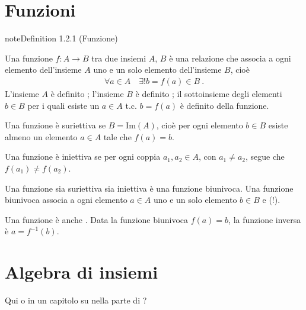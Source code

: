 \documentclass[letterpaper,10pt,italian]{jupyterBook}
\begin{document}
\section{}
\label{\detokenize{ch/set:id1}}

\section{Funzioni}
\label{\detokenize{ch/set:funzioni}}\label{\detokenize{ch/set:math-hs-fun}}\label{ch/set:set-fun-def}
\begin{sphinxadmonition}{note}{Definition 1.2.1 (Funzione)}



\sphinxAtStartPar
Una funzione \(f: A \rightarrow B\) tra due insiemi \(A\), \(B\) è una relazione che associa a ogni elemento dell’insieme \(A\) uno e un solo elemento dell’insieme \(B\), cioè
\begin{equation*}
\begin{split}\forall a \in A \quad \exists! b = f(a) \in B \ .\end{split}
\end{equation*}
\sphinxAtStartPar
L’insieme \(A\) è definito ; l’insieme \(B\) è definito ; il sottoinsieme degli elementi \(b \in B\) per i quali esiste un \(a \in A\) t.c. \(b = f(a)\) è definito  della funzione.
\end{sphinxadmonition}

\sphinxAtStartPar
{} Una funzione è suriettiva se \(B = \text{Im}(A)\), cioè per ogni elemento \(b \in B\) esiste almeno un elemento \(a \in A\) tale che \(f(a) = b\).

\sphinxAtStartPar
{} Una funzione è iniettiva se per ogni coppia \(a_1, a_2 \in A\), con \(a_1 \ne a_2\), segue che \(f(a_1) \ne f(a_2)\).

\sphinxAtStartPar
{} Una funzione sia suriettiva sia iniettiva è una funzione biunivoca. Una funzione biunivoca associa a ogni elemento \(a \in A\) uno e un solo elemento \(b \in B\) e (!).

\sphinxAtStartPar
Una funzione  è anche . Data la funzione biunivoca \(f(a) = b\), la funzione inversa è \(a = f^{-1}(b)\).


\section{Algebra di insiemi}
\label{\detokenize{ch/set:algebra-di-insiemi}}\label{\detokenize{ch/set:math-hs-set-algebra}}
\sphinxAtStartPar
{} Qui o in un capitolo su {\hyperref[\detokenize{ch/algebra/set-algebra-link:math-hs-algebra-set-link}]{}} nella parte di {\hyperref[\detokenize{ch/algebra:math-hs-algebra}]{}}?
\end{document}
